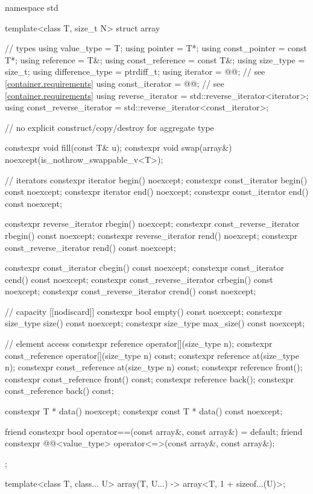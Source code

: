 %
%
%
%
%
\begin{codeblock}
namespace std {
  template<class T, size_t N>
  struct array {
    // types
    using value_type             = T;
    using pointer                = T*;
    using const_pointer          = const T*;
    using reference              = T&;
    using const_reference        = const T&;
    using size_type              = size_t;
    using difference_type        = ptrdiff_t;
    using iterator               = @@; // see \ref{container.requirements}
    using const_iterator         = @@; // see \ref{container.requirements}
    using reverse_iterator       = std::reverse_iterator<iterator>;
    using const_reverse_iterator = std::reverse_iterator<const_iterator>;

    // no explicit construct/copy/destroy for aggregate type

    constexpr void fill(const T& u);
    constexpr void swap(array&) noexcept(is_nothrow_swappable_v<T>);

    // iterators
    constexpr iterator               begin() noexcept;
    constexpr const_iterator         begin() const noexcept;
    constexpr iterator               end() noexcept;
    constexpr const_iterator         end() const noexcept;

    constexpr reverse_iterator       rbegin() noexcept;
    constexpr const_reverse_iterator rbegin() const noexcept;
    constexpr reverse_iterator       rend() noexcept;
    constexpr const_reverse_iterator rend() const noexcept;

    constexpr const_iterator         cbegin() const noexcept;
    constexpr const_iterator         cend() const noexcept;
    constexpr const_reverse_iterator crbegin() const noexcept;
    constexpr const_reverse_iterator crend() const noexcept;

    // capacity
    [[nodiscard]] constexpr bool empty() const noexcept;
    constexpr size_type size() const noexcept;
    constexpr size_type max_size() const noexcept;

    // element access
    constexpr reference       operator[](size_type n);
    constexpr const_reference operator[](size_type n) const;
    constexpr reference       at(size_type n);
    constexpr const_reference at(size_type n) const;
    constexpr reference       front();
    constexpr const_reference front() const;
    constexpr reference       back();
    constexpr const_reference back() const;

    constexpr T *       data() noexcept;
    constexpr const T * data() const noexcept;

    friend constexpr bool operator==(const array&, const array&) = default;
    friend constexpr @@<value_type>
      operator<=>(const array&, const array&);
  };

  template<class T, class... U>
    array(T, U...) -> array<T, 1 + sizeof...(U)>;
}
\end{codeblock}

